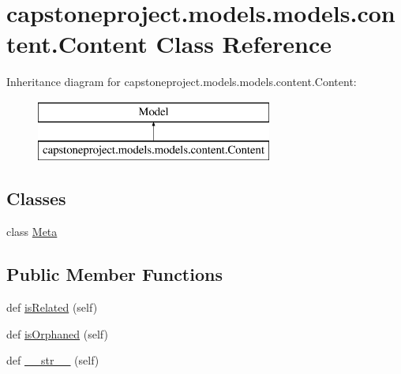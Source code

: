 \hypertarget{classcapstoneproject_1_1models_1_1models_1_1content_1_1_content}{}\section{capstoneproject.\+models.\+models.\+content.\+Content Class Reference}
\label{classcapstoneproject_1_1models_1_1models_1_1content_1_1_content}
Inheritance diagram for capstoneproject.\+models.\+models.\+content.\+Content\+:\begin{figure}[H]
\begin{center}
\leavevmode
\includegraphics[height=2.000000cm]{classcapstoneproject_1_1models_1_1models_1_1content_1_1_content}
\end{center}
\end{figure}
\subsection*{Classes}
\begin{DoxyCompactItemize}
\item 
class \mbox{\hyperlink{classcapstoneproject_1_1models_1_1models_1_1content_1_1_content_1_1_meta}{Meta}}
\end{DoxyCompactItemize}
\subsection*{Public Member Functions}
\begin{DoxyCompactItemize}
\item 
def \mbox{\hyperlink{classcapstoneproject_1_1models_1_1models_1_1content_1_1_content_aef00f5f6aaba41b1b808ac8cf8327dd2}{is\+Related}} (self)
\item 
def \mbox{\hyperlink{classcapstoneproject_1_1models_1_1models_1_1content_1_1_content_acf1686cea94ff68e24d969a43b7ee453}{is\+Orphaned}} (self)
\item 
def \mbox{\hyperlink{classcapstoneproject_1_1models_1_1models_1_1content_1_1_content_a2a41e3455e60f9c3dc3d46783381cc36}{\+\_\+\+\_\+str\+\_\+\+\_\+}} (self)
\end{DoxyCompactItemize}
